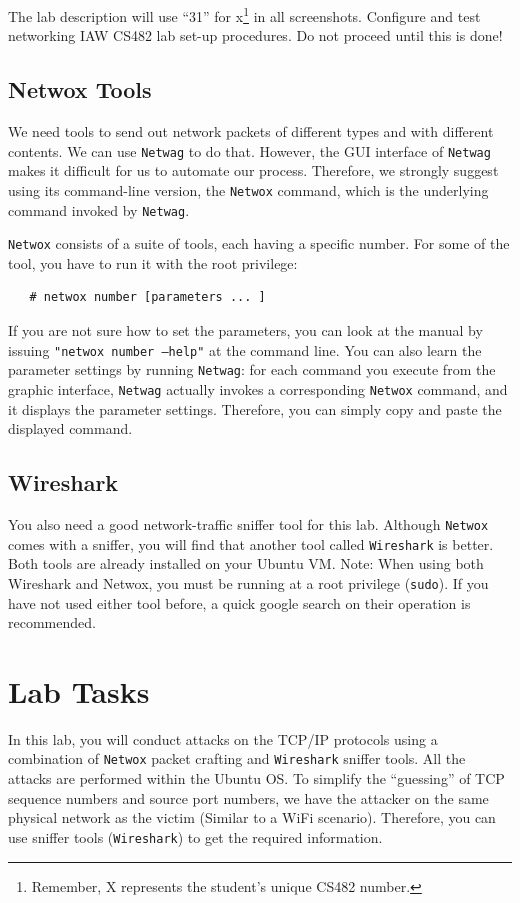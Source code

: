 \documentclass{article}
\begin{document}
The lab description will use ``31'' for x\footnote{Remember, X represents the student's unique CS482 number.} in all screenshots. Configure and test networking IAW CS482 lab set-up procedures.  Do not proceed until this is done!

\subsection{Netwox Tools}
We need tools to send out network packets of different types and with different contents. We can use {\tt Netwag} to do that. However, the GUI interface of {\tt Netwag} makes it difficult for us to automate our process. Therefore, we strongly suggest using its command-line version, the {\tt Netwox} command, which is the underlying command invoked by {\tt Netwag}.  

{\tt Netwox} consists of a suite of tools, each having a specific number. 
For some of the tool, you have to run it with the root privilege: 

\begin{verbatim}
   # netwox number [parameters ... ]
\end{verbatim}

If you are not sure how to set the parameters, you can look at the 
manual by issuing {\tt "netwox number --help"} at the command line.
You can also learn the parameter settings by running {\tt Netwag}:
for each command you execute from the graphic interface, {\tt Netwag} 
actually invokes a corresponding {\tt Netwox} command, and it displays
the parameter settings. Therefore, you can simply copy and paste 
the displayed command.


\subsection{Wireshark}
You also need a good network-traffic sniffer tool for this lab. 
Although {\tt Netwox} comes with a sniffer, you will find that 
another tool called {\tt Wireshark} is better. Both tools are already installed on your Ubuntu VM.  Note: When using both Wireshark and Netwox, you must be running at a root privilege ({\tt sudo}).
If you have not used either tool before, a quick google search on their operation is recommended.


\section{Lab Tasks}

In this lab, you will conduct attacks on the TCP/IP protocols using a combination of
{\tt Netwox} packet crafting and {\tt Wireshark} sniffer tools. All the attacks are performed within the Ubuntu OS. 
To simplify the ``guessing'' of TCP sequence numbers and source port numbers, 
we have the attacker on the same physical network as the victim (Similar to a WiFi scenario). 
Therefore, you can use sniffer tools ({\tt Wireshark}) to get the required information.
\end{document}
